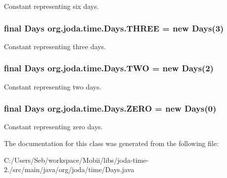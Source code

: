 Constant representing six days. \hypertarget{classorg_1_1joda_1_1time_1_1_days_ad769bba946770cb004529ae1c2ccaaa8}{
\subsubsection[{T\-H\-R\-E\-E}]{\setlength{\rightskip}{0pt plus 5cm}final {\bf Days} org.\-joda.\-time.\-Days.\-T\-H\-R\-E\-E = new {\bf Days}(3)\hspace{0.3cm}{\ttfamily [static]}}}\label{classorg_1_1joda_1_1time_1_1_days_ad769bba946770cb004529ae1c2ccaaa8}
Constant representing three days. \hypertarget{classorg_1_1joda_1_1time_1_1_days_a85081cb00a2b29440d8b8d62b6b3cc66}{
\subsubsection[{T\-W\-O}]{\setlength{\rightskip}{0pt plus 5cm}final {\bf Days} org.\-joda.\-time.\-Days.\-T\-W\-O = new {\bf Days}(2)\hspace{0.3cm}{\ttfamily [static]}}}\label{classorg_1_1joda_1_1time_1_1_days_a85081cb00a2b29440d8b8d62b6b3cc66}
Constant representing two days. \hypertarget{classorg_1_1joda_1_1time_1_1_days_a04717d60c37fa7a4c17e3423a4c19ea2}{
\subsubsection[{Z\-E\-R\-O}]{\setlength{\rightskip}{0pt plus 5cm}final {\bf Days} org.\-joda.\-time.\-Days.\-Z\-E\-R\-O = new {\bf Days}(0)\hspace{0.3cm}{\ttfamily [static]}}}\label{classorg_1_1joda_1_1time_1_1_days_a04717d60c37fa7a4c17e3423a4c19ea2}
Constant representing zero days. 

The documentation for this class was generated from the following file\-:\begin{DoxyCompactItemize}
\item 
C\-:/\-Users/\-Seb/workspace/\-Mobii/libs/joda-\/time-\/2./src/main/java/org/joda/time/Days.\-java\end{DoxyCompactItemize}
